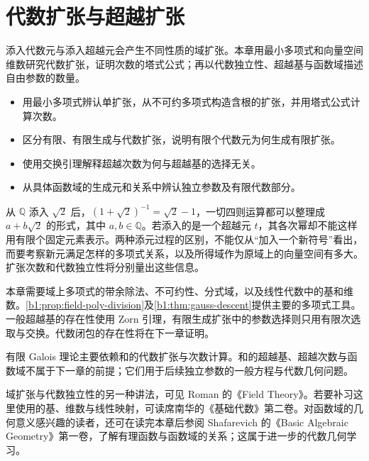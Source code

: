 
\chapter{代数扩张与超越扩张}
\label{b1:ch:14}

\begin{chapterabstract}
	添入代数元与添入超越元会产生不同性质的域扩张。本章用最小多项式和向量空间维数研究代数扩张，证明次数的塔式公式；再以代数独立性、超越基与函数域描述自由参数的数量。
\end{chapterabstract}

\begin{learninggoals}
	\begin{itemize}
		\item 用最小多项式辨认单扩张，从不可约多项式构造含根的扩张，并用塔式公式计算次数。
		\item 区分有限、有限生成与代数扩张，说明有限个代数元为何生成有限扩张。
		\item 使用交换引理解释超越次数为何与超越基的选择无关。
		\item 从具体函数域的生成元和关系中辨认独立参数及有限代数部分。
	\end{itemize}
\end{learninggoals}

从 \(\mathbb Q\) 添入 \(\sqrt2\) 后，\((1+\sqrt2)^{-1}=\sqrt2-1\)，一切四则运算都可以整理成 \(a+b\sqrt2\) 的形式，其中 \(a,b\in\mathbb Q\)。若添入的是一个超越元 \(t\)，其各次幂却不能这样用有限个固定元素表示。两种添元过程的区别，不能仅从“加入一个新符号”看出，而要考察新元满足怎样的多项式关系，以及所得域作为原域上的向量空间有多大。扩张次数和代数独立性将分别量出这些信息。

\ProseParagraphBreak

本章需要域上多项式的带余除法、不可约性、分式域，以及线性代数中的基和维数。\cref{b1:prop:field-poly-division}及\cref{b1:thm:gauss-descent}提供主要的多项式工具。一般超越基的存在性使用 Zorn 引理，有限生成扩张中的参数选择则只用有限次选取与交换。代数闭包的存在性将在下一章证明。

\ProseParagraphBreak
有限 Galois 理论主要依赖和的代数扩张与次数计算。和的超越基、超越次数与函数域不属于下一章的前提；它们用于后续独立参数的一般方程与代数几何问题。

\ProseParagraphBreak
域扩张与代数独立性的另一种讲法，可见 Roman 的《Field Theory》\cite[Chapter 2; Sections 4.2--4.3]{Roman2006FieldTheory}。若要补习这里使用的基、维数与线性映射，可读席南华的《基础代数》第二卷\cite[第1--2章]{Xi2018BasicAlgebraII}。对函数域的几何意义感兴趣的读者，还可在读完本章后参阅 Shafarevich 的《Basic Algebraic Geometry》第一卷\cite[Chapter 1, Sections 1.3, 3.1--3.3]{Shafarevich2013BasicAGI}，了解有理函数与函数域的关系；这属于进一步的代数几何学习。

